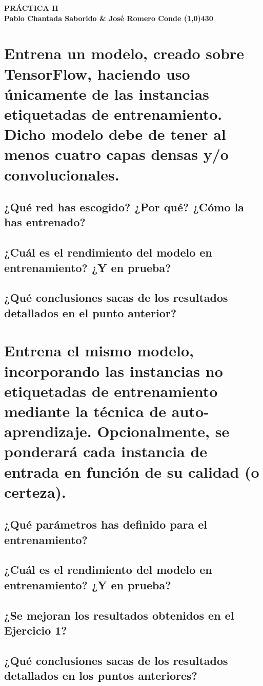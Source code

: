 \documentclass{article}
\begin{document}
\begin{center}
    \LARGE\bfseries PRÁCTICA II\\
    \small Pablo Chantada Saborido \& José Romero Conde
    \line(1,0){430}
\end{center}


\newpage

\section{Entrena un modelo, creado sobre TensorFlow, haciendo uso únicamente de las instancias etiquetadas de entrenamiento. Dicho modelo debe de tener al menos cuatro capas densas y/o convolucionales.}
\subsection{¿Qué red has escogido? ¿Por qué? ¿Cómo la has entrenado?}
\subsection{¿Cuál es el rendimiento del modelo en entrenamiento? ¿Y en prueba?}
\subsection{¿Qué conclusiones sacas de los resultados detallados en el punto anterior?}

\newpage
\section{Entrena el mismo modelo, incorporando las instancias no etiquetadas de entrenamiento mediante la técnica de auto-aprendizaje. Opcionalmente, se ponderará cada instancia de entrada en función de su calidad (o certeza).}
\subsection{¿Qué parámetros has definido para el entrenamiento?}
\subsection{¿Cuál es el rendimiento del modelo en entrenamiento? ¿Y en prueba?}
\subsection{¿Se mejoran los resultados obtenidos en el Ejercicio 1?}
\subsection{¿Qué conclusiones sacas de los resultados detallados en los puntos anteriores?}
\end{document}
